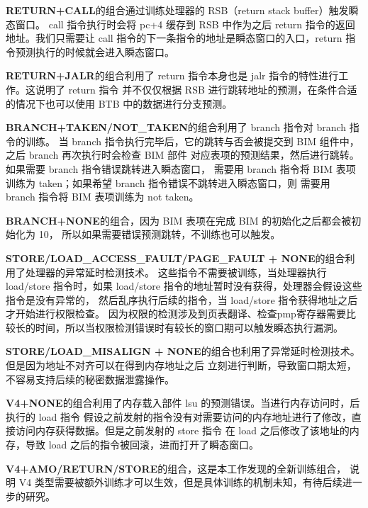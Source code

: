 \textbf{RETURN+CALL}的组合通过训练处理器的 RSB（return stack buffer）触发瞬态窗口。
call 指令执行时会将 pc+4 缓存到 RSB 中作为之后 return 指令的返回地址。我们只需要让
call 指令的下一条指令的地址是瞬态窗口的入口，return 指令预测执行的时候就会进入瞬态窗口。\par

\textbf{RETURN+JALR}的组合利用了 return 指令本身也是 jalr 指令的特性进行工作。这说明了 return 指令
并不仅仅根据 RSB 进行跳转地址的预测，在条件合适的情况下也可以使用 BTB 中的数据进行分支预测。\par

\textbf{BRANCH+TAKEN/NOT\_TAKEN}的组合利用了 branch 指令对 branch 指令的训练。
当 branch 指令执行完毕后，它的跳转与否会被提交到 BIM 组件中，之后 branch 再次执行时会检查 BIM 部件
对应表项的预测结果，然后进行跳转。如果需要 branch 指令错误跳转进入瞬态窗口，
需要用 branch 指令将 BIM 表项训练为 taken；如果希望 branch 指令错误不跳转进入瞬态窗口，则
需要用 branch 指令将 BIM 表项训练为 not taken。\par

\textbf{BRANCH+NONE}的组合，因为 BIM 表项在完成 BIM 的初始化之后都会被初始化为 10，
所以如果需要错误预测跳转，不训练也可以触发。\par

\textbf{STORE/LOAD\_ACCESS\_FAULT/PAGE\_FAULT + NONE}的组合利用了处理器的异常延时检测技术。
这些指令不需要被训练，当处理器执行 load/store 指令时，如果 load/store 指令的地址暂时没有获得，处理器会假设这些指令是没有异常的，
然后乱序执行后续的指令，当 load/store 指令获得地址之后才开始进行权限检查。
因为权限的检测涉及到页表翻译、检查pmp寄存器需要比较长的时间，所以当权限检测错误时有较长的窗口期可以触发瞬态执行漏洞。\par

\textbf{STORE/LOAD\_MISALIGN + NONE}的组合也利用了异常延时检测技术。但是因为地址不对齐可以在得到内存地址之后
立刻进行判断，导致窗口期太短，不容易支持后续的秘密数据泄露操作。\par

\textbf{V4+NONE}的组合利用了内存载入部件 lsu 的预测错误。当进行内存访问时，后执行的 load 指令
假设之前发射的指令没有对需要访问的内存地址进行了修改，直接访问内存获得数据。但是之前发射的 store 指令
在 load 之后修改了该地址的内存，导致 load 之后的指令被回滚，进而打开了瞬态窗口。\par

\textbf{V4+AMO/RETURN/STORE}的组合，这是本工作发现的全新训练组合，
说明 V4 类型需要被额外训练才可以生效，但是具体训练的机制未知，有待后续进一步的研究。\par

